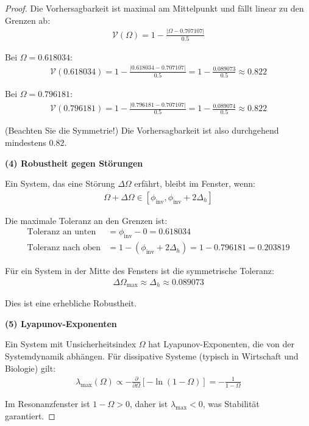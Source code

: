 \documentclass[a4paper,12pt,twoside]{report}
\theoremstyle{definition}
\begin{document}
\begin{proof}
Die Vorhersagbarkeit ist maximal am Mittelpunkt und fällt linear zu den Grenzen ab:
\begin{align}
\mathcal{V}(\Omega) = 1 - \frac{|\Omega - 0.707107|}{0.5}
\end{align}

Bei $\Omega = 0.618034$:
\begin{align}
\mathcal{V}(0.618034) = 1 - \frac{|0.618034 - 0.707107|}{0.5} = 1 - \frac{0.089073}{0.5} \approx 0.822
\end{align}

Bei $\Omega = 0.796181$:
\begin{align}
\mathcal{V}(0.796181) = 1 - \frac{|0.796181 - 0.707107|}{0.5} = 1 - \frac{0.089074}{0.5} \approx 0.822
\end{align}

(Beachten Sie die Symmetrie!) Die Vorhersagbarkeit ist also durchgehend mindestens $0.82$.

\textbf{(4) Robustheit gegen Störungen}

Ein System, das eine Störung $\Delta\Omega$ erfährt, bleibt im Fenster, wenn:
\begin{align}
\Omega + \Delta\Omega \in [\phi_{\text{inv}}, \phi_{\text{inv}} + 2\Delta_h]
\end{align}

Die maximale Toleranz an den Grenzen ist:
\begin{align}
\text{Toleranz an unten} &= \phi_{\text{inv}} - 0 = 0.618034 \\
\text{Toleranz nach oben} &= 1 - (\phi_{\text{inv}} + 2\Delta_h) = 1 - 0.796181 = 0.203819
\end{align}

Für ein System in der Mitte des Fensters ist die symmetrische Toleranz:
\begin{align}
\Delta\Omega_{\text{max}} \approx \Delta_h \approx 0.089073
\end{align}

Dies ist eine erhebliche Robustheit.

\textbf{(5) Lyapunov-Exponenten}

Ein System mit Unsicherheitsindex $\Omega$ hat Lyapunov-Exponenten, die von der Systemdynamik abhängen. Für dissipative Systeme (typisch in Wirtschaft und Biologie) gilt:
\begin{align}
\lambda_{\text{max}}(\Omega) \propto -\frac{\partial}{\partial \Omega}[-\ln(1-\Omega)] = -\frac{1}{1-\Omega}
\end{align}

Im Resonanzfenster ist $1 - \Omega > 0$, daher ist $\lambda_{\text{max}} < 0$, was Stabilität garantiert.

\end{proof}
\end{document}
